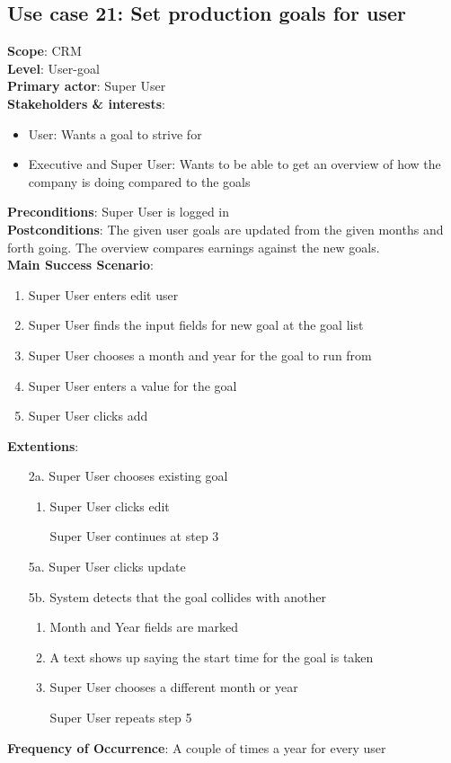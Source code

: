 \subsection{Use case 21: Set production goals for user}
\textbf{Scope}: CRM \\
\textbf{Level}: User-goal \\
\textbf{Primary actor}: Super User \\
\textbf{Stakeholders \& interests}:
\begin{itemize}
  \item User: Wants a goal to strive for
  \item Executive and Super User: Wants to be able to get an overview of how the company is doing compared to the goals
\end{itemize}
\textbf{Preconditions}: Super User is logged in \\
\textbf{Postconditions}: The given user goals are updated from the given months and forth going. The overview compares earnings against the new goals.\\
\textbf{Main Success Scenario}:
\begin{enumerate}
  \item Super User enters edit user
  \item Super User finds the input fields for new goal at the goal list
  \item Super User chooses a month and year for the goal to run from
  \item Super User enters a value for the goal
  \item Super User clicks add
\end{enumerate}
\textbf{Extentions}:
\begin{itemize}
  \item [2a.] Super User chooses existing goal
  \begin{enumerate}
    \item Super User clicks edit
    \item [] Super User continues at step 3
  \end{enumerate}
  \item [5a.] Super User clicks update
  \item [5b.] System detects that the goal collides with another
  \begin{enumerate}
    \item Month and Year fields are marked
    \item A text shows up saying the start time for the goal is taken
    \item Super User chooses a different month or year
    \item [] Super User repeats step 5
  \end{enumerate}
\end{itemize}
\textbf{Frequency of Occurrence}: A couple of times a year for every user


